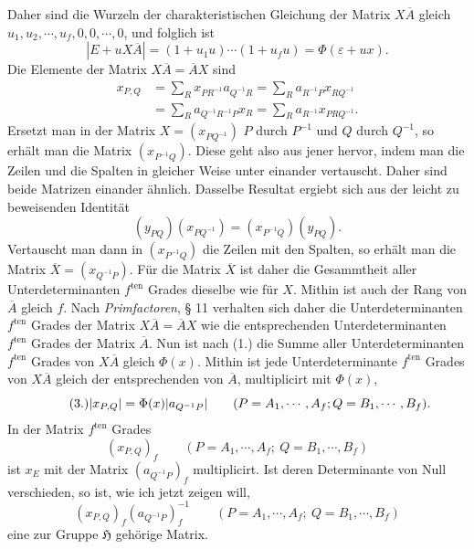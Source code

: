 \documentclass[11pt]{article}
\newcommand{\Hgr}{\mathfrak{H}}
\newcommand{\eps}{\varepsilon}
\newcommand{\ten}{\mathrm{ten}}
\begin{document}
Daher sind die Wurzeln der charakteristischen Gleichung der Matrix $X\overline{A}$ gleich $u_1,u_2,\cdots,u_f,0,0,\cdots,0$, und folglich ist
\begin{equation}\tag{1.}
|E+uX\overline{A}|=(1+u_1u)\cdots(1+u_fu)=\Phi(\eps+ux).
\end{equation}
Die Elemente der Matrix $X\overline{A}=\overline{A}X$ sind
\begin{equation}\tag{2.}
\begin{aligned}
x_{P,Q}&=\sum_R x_{PR^{-1}}a_{Q^{-1}R}
       =\sum_R a_{R^{-1}P}x_{RQ^{-1}}\\
      &=\sum_R a_{Q^{-1}R^{-1}P}x_R
       =\sum_R a_{R^{-1}}x_{PRQ^{-1}}.
\end{aligned}
\end{equation}
Ersetzt man in der Matrix $X=(x_{PQ^{-1}})$ $P$ durch $P^{-1}$ und $Q$ durch $Q^{-1}$, so erhält man die Matrix $(x_{P^{-1}Q})$. Diese geht also aus jener hervor, indem man die Zeilen und die Spalten in gleicher Weise unter einander vertauscht. Daher sind beide Matrizen einander ähnlich. Dasselbe Resultat ergiebt sich aus der leicht zu beweisenden Identität
\[
(y_{PQ})(x_{PQ^{-1}})=(x_{P^{-1}Q})(y_{PQ}).
\]
Vertauscht man dann in $(x_{P^{-1}Q})$ die Zeilen mit den Spalten, so erhält man die Matrix $\overline{X}=(x_{Q^{-1}P})$. Für die Matrix $\overline{X}$ ist daher die Gesammtheit aller Unterdeterminanten $f^{\ten}$ Grades dieselbe wie für $X$. Mithin ist auch der Rang von $\overline{A}$ gleich $f$. Nach \emph{Primfactoren}, § 11 verhalten sich daher die Unterdeterminanten $f^{\ten}$ Grades der Matrix $X\overline{A}=\overline{A}X$ wie die entsprechenden Unterdeterminanten $f^{\ten}$ Grades der Matrix $\overline{A}$. Nun ist nach (1.) die Summe aller Unterdeterminanten $f^{\ten}$ Grades von $X\overline{A}$ gleich $\Phi(x)$. Mithin ist jede Unterdeterminante $f^{\ten}$ Grades von $X\overline{A}$ gleich der entsprechenden von $\overline{A}$, multiplicirt mit $\Phi(x)$,
\begin{equation}\tag{3.}
|x_{P,Q}|=\Phi(x)|a_{Q^{-1}P}|
\qquad(P=A_1,\cdots,A_f;\\ Q=B_1,\cdots,B_f).
\end{equation}
In der Matrix $f^{\ten}$ Grades
\[
(x_{P,Q})_f\qquad(P=A_1,\cdots,A_f;\ Q=B_1,\cdots,B_f)
\]
ist $x_E$ mit der Matrix $(a_{Q^{-1}P})_f$ multiplicirt. Ist deren Determinante von Null verschieden, so ist, wie ich jetzt zeigen will,
\begin{equation}\tag{4.}
(x_{P,Q})_f(a_{Q^{-1}P})_f^{-1}
\qquad(P=A_1,\cdots,A_f;\ Q=B_1,\cdots,B_f)
\end{equation}
eine zur Gruppe $\Hgr$ gehörige Matrix.
\end{document}
